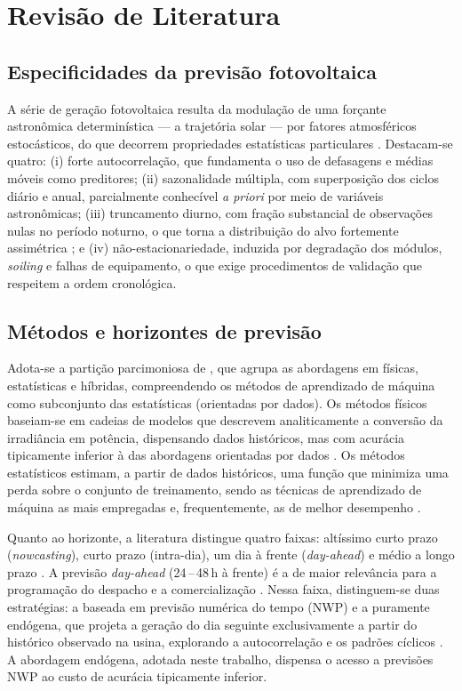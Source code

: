 \section{Revisão de Literatura}

\subsection{Especificidades da previsão fotovoltaica}

A série de geração fotovoltaica resulta da modulação de uma forçante astronômica determinística — a trajetória solar — por fatores atmosféricos estocásticos, do que decorrem propriedades estatísticas particulares \citep{markovics2022}. Destacam-se quatro: (i) forte autocorrelação, que fundamenta o uso de defasagens e médias móveis como preditores; (ii) sazonalidade múltipla, com superposição dos ciclos diário e anual, parcialmente conhecível \textit{a priori} por meio de variáveis astronômicas; (iii) truncamento diurno, com fração substancial de observações nulas no período noturno, o que torna a distribuição do alvo fortemente assimétrica \citep{andrade2023}; e (iv) não-estacionariedade, induzida por degradação dos módulos, \textit{soiling} e falhas de equipamento, o que exige procedimentos de validação que respeitem a ordem cronológica.

\subsection{Métodos e horizontes de previsão}

Adota-se a partição parcimoniosa de \citet{markovics2022}, que agrupa as abordagens em físicas, estatísticas e híbridas, compreendendo os métodos de aprendizado de máquina como subconjunto das estatísticas (orientadas por dados). Os métodos físicos baseiam-se em cadeias de modelos que descrevem analiticamente a conversão da irradiância em potência, dispensando dados históricos, mas com acurácia tipicamente inferior à das abordagens orientadas por dados \citep{andrade2023}. Os métodos estatísticos estimam, a partir de dados históricos, uma função que minimiza uma perda sobre o conjunto de treinamento, sendo as técnicas de aprendizado de máquina as mais empregadas e, frequentemente, as de melhor desempenho \citep{markovics2022}.

Quanto ao horizonte, a literatura distingue quatro faixas: altíssimo curto prazo (\textit{nowcasting}), curto prazo (intra-dia), um dia à frente (\textit{day-ahead}) e médio a longo prazo \citep{tian2023}. A previsão \textit{day-ahead} (24\,--\,48\,h à frente) é a de maior relevância para a programação do despacho e a comercialização \citep{markovics2022}. Nessa faixa, distinguem-se duas estratégias: a baseada em previsão numérica do tempo (NWP) e a puramente endógena, que projeta a geração do dia seguinte exclusivamente a partir do histórico observado na usina, explorando a autocorrelação e os padrões cíclicos \citep{andrade2023}. A abordagem endógena, adotada neste trabalho, dispensa o acesso a previsões NWP ao custo de acurácia tipicamente inferior.

